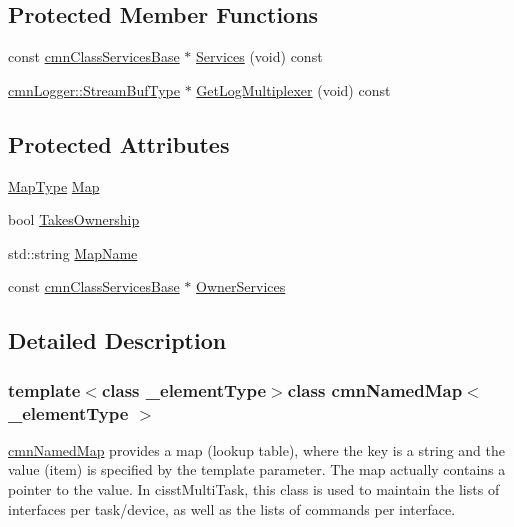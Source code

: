 \subsection*{Protected Member Functions}
{\bf }\par
\begin{DoxyCompactItemize}
\item 
const \hyperlink{classcmn_class_services_base}{cmn\+Class\+Services\+Base} $\ast$ \hyperlink{classcmn_named_map_ae27d833a5b4bb6fd27982d571a9479fa}{Services} (void) const 
\item 
\hyperlink{classcmn_logger_a7d192777882d1dc6bb48ceac0b4e65bb}{cmn\+Logger\+::\+Stream\+Buf\+Type} $\ast$ \hyperlink{classcmn_named_map_a1b154ee9ae3a3eaa748b867702f206d4}{Get\+Log\+Multiplexer} (void) const 
\end{DoxyCompactItemize}

\subsection*{Protected Attributes}
\begin{DoxyCompactItemize}
\item 
\hyperlink{classcmn_named_map_a35919ad9cccf3e060063b489db663425}{Map\+Type} \hyperlink{classcmn_named_map_aa5cb7ee747ba8ccc07557a5da5d48b19}{Map}
\item 
bool \hyperlink{classcmn_named_map_ad3775ffc68ea99a853f8eed94f1f1a4f}{Takes\+Ownership}
\item 
std\+::string \hyperlink{classcmn_named_map_a5dd1ca924e7481edf3e9c6f65c0f4b3d}{Map\+Name}
\item 
const \hyperlink{classcmn_class_services_base}{cmn\+Class\+Services\+Base} $\ast$ \hyperlink{classcmn_named_map_a8e6bffe8f1bdc710bacc3f1d38d75621}{Owner\+Services}
\end{DoxyCompactItemize}


\subsection{Detailed Description}
\subsubsection*{template$<$class \+\_\+element\+Type$>$class cmn\+Named\+Map$<$ \+\_\+element\+Type $>$}

\hyperlink{classcmn_named_map}{cmn\+Named\+Map} provides a map (lookup table), where the key is a string and the value (item) is specified by the template parameter. The map actually contains a pointer to the value. In cisst\+Multi\+Task, this class is used to maintain the lists of interfaces per task/device, as well as the lists of commands per interface.

